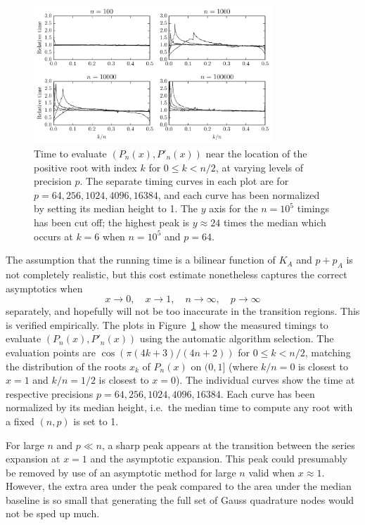 \documentclass{siamart0216}
\begin{document}
\begin{figure}[h!]
\begin{centering}
\includegraphics[width=0.8\textwidth]{timeplot}
\caption{Time to evaluate $(P_n(x), P'_n(x))$ near the location of the positive root with index $k$ for $0 \le k < n/2$, at varying levels of precision $p$.
The separate timing curves in each plot are for $p = 64, 256, 1024, 4096, 16384$, and each curve has been normalized by setting its median height to 1. The $y$ axis for the $n = 10^5$ timings has been cut off; the highest peak is $y \approx 24$ times the median which occurs at $k = 6$ when $n = 10^5$ and $p = 64$.}
\label{fig:timeplot}
\end{centering}
\end{figure}

The assumption that the running time is a bilinear function of $K_A$ and $p + p_A$ is not completely realistic, but this cost estimate nonetheless captures the correct asymptotics when
$$x \to 0, \quad x \to 1, \quad n \to \infty, \quad p \to \infty$$
separately, and hopefully will not be too inaccurate in the transition regions. This is verified empirically. The plots in Figure~\ref{fig:timeplot} show the measured
timings to evaluate $(P_n(x), P'_n(x))$ using the automatic algorithm selection.
The evaluation points are $\cos(\pi (4k+3)/(4n+2))$ for $0 \le k < n/2$, matching
the distribution of the roots $x_k$ of $P_n(x)$ on $(0,1]$ (where $k/n = 0$ is closest to $x = 1$ and $k/n = 1/2$ is closest to $x = 0$).
The individual curves show the time at respective precisions $p = 64, 256, 1024, 4096, 16384$.
Each curve has been normalized by its median height, i.e.\ the median time to compute any root with a fixed $(n,p)$ is set to 1.

For large $n$ and $p \ll n$, a sharp peak appears at the transition between the series expansion at $x = 1$ and the asymptotic expansion. This peak could presumably be removed by use of an asymptotic method for large $n$ valid when $x \approx 1$. However, the extra area under the peak compared to the area under the median baseline is so small that generating the full set of Gauss quadrature nodes would not be sped up much.
\end{document}
